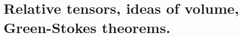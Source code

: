 \setcounter{chapter}{6}
\chapter{Relative tensors, ideas of volume, Green-Stokes theorems.}
\pagebreak[4]
\begin{comment}
\section{p241 - Exercise}
\begin{tcolorbox}
If $b_{rs}$ is an absolute tensor, show that the determinant $\left|b_{rs}\right|$ is a relative invariant of weight $2$. What are the tensor characters of $\left|c^{rs}\right|$ and $\left|f^r_{s}\right|$?
\end{tcolorbox}
As $b_{rs}$ is an absolute tensor, we have 
\begin{align}
b^{'}_{uv}&= b_{rs}\pdv{x^r}{x^{'u}}\pdv{x^s}{x^{'v}}
\end{align}
Hence,
\begin{align}
\left|b^{'}_{uv}\right|&= \left|b_{rs}\right|\left|\pdv{x^r}{x^{'u}}\right|\left|\pdv{x^s}{x^{'v}}\right|
\end{align}
and as $J= \left|\pdv{x^k}{x^{'s}}\right|$ we get 
\begin{align}
\left|b^{'}_{uv}\right|&= J^2\left|b_{rs}\right|
\end{align}
Conclusion, $\left|b_{rs}\right|$ is a relative invariant of weight $ 2$.
$$\lozenge$$
As $c^{rs}$ is an absolute tensor, we have 
\begin{align}
c^{'uv}&= c^{rs}\pdv{x^{'u}}{x^r}\pdv{x^{'v}}{x^s}
\end{align}
Hence,
\begin{align}
\left|c^{'uv}\right|&= \left|c^{rs}\right|\left|\pdv{x^{'u}}{x^r}\right|\left|\pdv{x^{'v}}{x^s}\right|
\end{align}
and as $J^{-1}= \left|\pdv{x^{'s}}{x^k}\right|$ we get 
\begin{align}
\left|c^{'uv}\right|&= J^{-2}\left|c^{rs}\right|
\end{align}
Conclusion, $\left|c^{rs}\right|$ is a relative invariant of weight $ -2$.
$$\lozenge$$
As $f^{r}_{s}$ is an absolute tensor, we have 
\begin{align}
f^{'u}_{v}&= f^{r}_{s}\pdv{x^{'u}}{x^r}\pdv{x^s}{x^{'v}}
\end{align}
Hence,
\begin{align}
\left|f^{'u}_{v}\right|&= \left|f^{r}_{s}\right|\left|\pdv{x^{'u}}{x^r}\right|\left|\pdv{x^s}{x^{'v}}\right|
\end{align}
and we get 
\begin{align}
\left|f^{'u}_{v}\right|&= JJ^{-1}\left|f^{r}_{s}\right|
\end{align}
Conclusion, $\left|f^{r}_{s}\right|$ is an absolute  invariant tensor .
$$\blacklozenge$$
\newpage




\end{comment}
